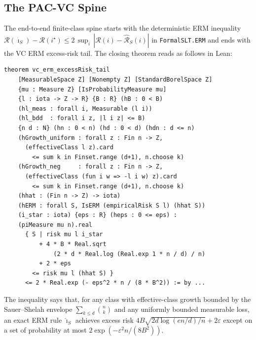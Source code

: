 \documentclass[sigplan,anonymous,review,screen]{acmart}
\newcommand{\Risk}{\mathcal{R}}
\newcommand{\eRisk}{\widehat{\mathcal{R}}}
\begin{document}
\subsection{The PAC-VC Spine}
\label{sec:spine}

The end-to-end finite-class spine starts with the deterministic ERM
inequality $\Risk(\hat{\imath}_S) - \Risk(i^\star)
\le 2\,\sup_i\,|\Risk(i) - \eRisk_S(i)|$ in \texttt{FormalSLT.ERM} and
ends with the VC ERM excess-risk tail. The closing theorem reads as
follows in Lean:

\begin{lstlisting}[caption={VC ERM excess-risk tail
                  (\texttt{FormalSLT/VC/SampleComplexity.lean:334}).},
                  label={lst:vcerm}]
theorem vc_erm_excessRisk_tail
    [MeasurableSpace Z] [Nonempty Z] [StandardBorelSpace Z]
    {mu : Measure Z} [IsProbabilityMeasure mu]
    {l : iota -> Z -> R} {B : R} (hB : 0 < B)
    (hl_meas : forall i, Measurable (l i))
    (hl_bdd  : forall i z, |l i z| <= B)
    {n d : N} (hn : 0 < n) (hd : 0 < d) (hdn : d <= n)
    (hGrowth_uniform : forall z : Fin n -> Z,
      (effectiveClass l z).card
        <= sum k in Finset.range (d+1), n.choose k)
    (hGrowth_neg     : forall z : Fin n -> Z,
      (effectiveClass (fun i w => -l i w) z).card
        <= sum k in Finset.range (d+1), n.choose k)
    (hhat : (Fin n -> Z) -> iota)
    (hERM : forall S, IsERM (empiricalRisk S l) (hhat S))
    (i_star : iota) {eps : R} (heps : 0 <= eps) :
    (piMeasure mu n).real
      { S | risk mu l i_star
          + 4 * B * Real.sqrt
              (2 * d * Real.log (Real.exp 1 * n / d) / n)
          + 2 * eps
        <= risk mu l (hhat S) }
      <= 2 * Real.exp (- eps^2 * n / (8 * B^2)) := by ...
\end{lstlisting}

\noindent
The inequality says that, for any class with effective-class growth
bounded by the Sauer--Shelah envelope $\sum_{k\le d} \binom{n}{k}$ and
any uniformly bounded measurable loss, an exact ERM rule
$\hat{\imath}_S$ achieves excess risk
$4B\sqrt{2 d \log(en/d)/n} + 2\varepsilon$ except on a set of
probability at most $2 \exp(-\varepsilon^{2} n / (8 B^{2}))$.
\end{document}
